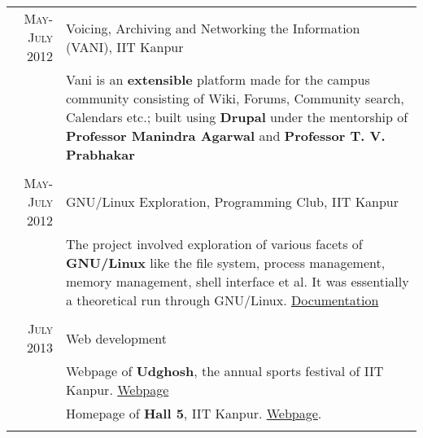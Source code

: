 \documentclass[a4paper,10pt]{article} %
\begin{document}
\begin{tabular}{r|p{11cm}}

    \textsc{May-July 2012} & Voicing, Archiving and Networking the Information \textsc{(VANI)}, IIT Kanpur\\
        & \footnotesize{Vani is an \textbf{extensible} platform made for the campus community consisting of Wiki, Forums,
                Community search, Calendars etc.; built using \textbf{Drupal} under the mentorship of
                \textbf{Professor Manindra Agarwal} and \textbf{Professor T. V. Prabhakar} } \\
            \\

    \textsc{May-July 2012} & GNU/Linux Exploration, Programming Club, IIT Kanpur\\
        & \footnotesize{ The project involved exploration of various facets of \textbf{GNU/Linux} like the file system,
            process management, memory management, shell interface et al.
            It was essentially a theoretical run through GNU/Linux.
            \href{https://docs.google.com/document/d/1ZHO9w36aoq3oaZBR4Um1AOmDfiTDAEgM6baQAu3icw4/edit?usp=sharing} {Documentation} } \\
            \\

    \textsc{July 2013} & Web development\\
        & \footnotesize{Webpage of \textbf{Udghosh}, the annual sports festival of IIT Kanpur. \href{www.udghosh.org} {Webpage} } \\
        & \footnotesize{Homepage of \textbf{Hall 5}, IIT Kanpur. \href{http://www.iitk.ac.in/hall5} {Webpage}. } \\
        \\


\end{tabular}
\end{document}

